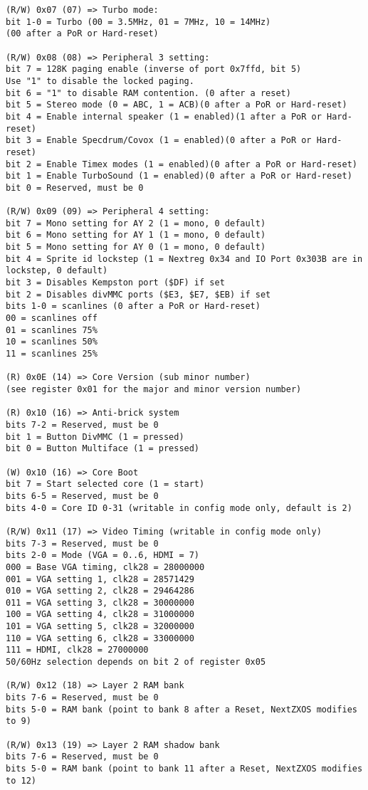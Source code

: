 \begin{verbatim}
(R/W) 0x07 (07) => Turbo mode:
bit 1-0 = Turbo (00 = 3.5MHz, 01 = 7MHz, 10 = 14MHz)
(00 after a PoR or Hard-reset)

(R/W) 0x08 (08) => Peripheral 3 setting:
bit 7 = 128K paging enable (inverse of port 0x7ffd, bit 5)
Use "1" to disable the locked paging.
bit 6 = "1" to disable RAM contention. (0 after a reset)
bit 5 = Stereo mode (0 = ABC, 1 = ACB)(0 after a PoR or Hard-reset)
bit 4 = Enable internal speaker (1 = enabled)(1 after a PoR or Hard-reset)
bit 3 = Enable Specdrum/Covox (1 = enabled)(0 after a PoR or Hard-reset)
bit 2 = Enable Timex modes (1 = enabled)(0 after a PoR or Hard-reset)
bit 1 = Enable TurboSound (1 = enabled)(0 after a PoR or Hard-reset)
bit 0 = Reserved, must be 0

(R/W) 0x09 (09) => Peripheral 4 setting:
bit 7 = Mono setting for AY 2 (1 = mono, 0 default)
bit 6 = Mono setting for AY 1 (1 = mono, 0 default)
bit 5 = Mono setting for AY 0 (1 = mono, 0 default)
bit 4 = Sprite id lockstep (1 = Nextreg 0x34 and IO Port 0x303B are in lockstep, 0 default)
bit 3 = Disables Kempston port ($DF) if set
bit 2 = Disables divMMC ports ($E3, $E7, $EB) if set
bits 1-0 = scanlines (0 after a PoR or Hard-reset)
00 = scanlines off
01 = scanlines 75%
10 = scanlines 50%
11 = scanlines 25%

(R) 0x0E (14) => Core Version (sub minor number)
(see register 0x01 for the major and minor version number)

(R) 0x10 (16) => Anti-brick system
bits 7-2 = Reserved, must be 0
bit 1 = Button DivMMC (1 = pressed)
bit 0 = Button Multiface (1 = pressed)

(W) 0x10 (16) => Core Boot
bit 7 = Start selected core (1 = start)
bits 6-5 = Reserved, must be 0
bits 4-0 = Core ID 0-31 (writable in config mode only, default is 2)

(R/W) 0x11 (17) => Video Timing (writable in config mode only)
bits 7-3 = Reserved, must be 0
bits 2-0 = Mode (VGA = 0..6, HDMI = 7)
000 = Base VGA timing, clk28 = 28000000
001 = VGA setting 1, clk28 = 28571429
010 = VGA setting 2, clk28 = 29464286
011 = VGA setting 3, clk28 = 30000000
100 = VGA setting 4, clk28 = 31000000
101 = VGA setting 5, clk28 = 32000000
110 = VGA setting 6, clk28 = 33000000
111 = HDMI, clk28 = 27000000
50/60Hz selection depends on bit 2 of register 0x05

(R/W) 0x12 (18) => Layer 2 RAM bank
bits 7-6 = Reserved, must be 0
bits 5-0 = RAM bank (point to bank 8 after a Reset, NextZXOS modifies to 9)

(R/W) 0x13 (19) => Layer 2 RAM shadow bank
bits 7-6 = Reserved, must be 0
bits 5-0 = RAM bank (point to bank 11 after a Reset, NextZXOS modifies to 12)


\end{verbatim}
